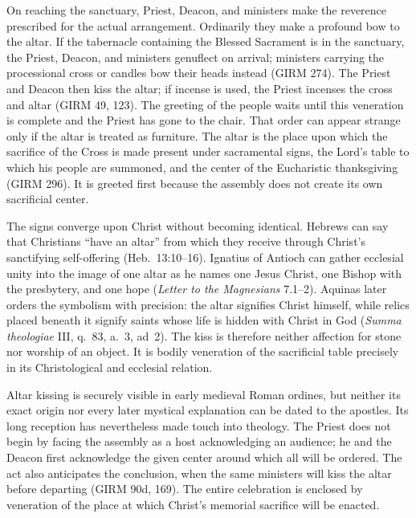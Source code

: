 
On reaching the sanctuary, Priest, Deacon, and ministers make the reverence prescribed for the actual arrangement. Ordinarily they make a profound bow to the altar. If the tabernacle containing the Blessed Sacrament is in the sanctuary, the Priest, Deacon, and ministers genuflect on arrival; ministers carrying the processional cross or candles bow their heads instead (GIRM 274). The Priest and Deacon then kiss the altar; if incense is used, the Priest incenses the cross and altar (GIRM 49, 123). The greeting of the people waits until this veneration is complete and the Priest has gone to the chair. That order can appear strange only if the altar is treated as furniture. The altar is the place upon which the sacrifice of the Cross is made present under sacramental signs, the Lord's table to which his people are summoned, and the center of the Eucharistic thanksgiving (GIRM 296). It is greeted first because the assembly does not create its own sacrificial center.

The signs converge upon Christ without becoming identical. Hebrews can say that Christians ``have an altar'' from which they receive through Christ's sanctifying self-offering (Heb.~13:10--16). Ignatius of Antioch can gather ecclesial unity into the image of one altar as he names one Jesus Christ, one Bishop with the presbytery, and one hope (\emph{Letter to the Magnesians} 7.1--2). Aquinas later orders the symbolism with precision: the altar signifies Christ himself, while relics placed beneath it signify saints whose life is hidden with Christ in God (\emph{Summa theologiae} III, q.~83, a.~3, ad~2). The kiss is therefore neither affection for stone nor worship of an object. It is bodily veneration of the sacrificial table precisely in its Christological and ecclesial relation.

Altar kissing is securely visible in early medieval Roman ordines, but neither its exact origin nor every later mystical explanation can be dated to the apostles. Its long reception has nevertheless made touch into theology. The Priest does not begin by facing the assembly as a host acknowledging an audience; he and the Deacon first acknowledge the given center around which all will be ordered. The act also anticipates the conclusion, when the same ministers will kiss the altar before departing (GIRM 90d, 169). The entire celebration is enclosed by veneration of the place at which Christ's memorial sacrifice will be enacted.

